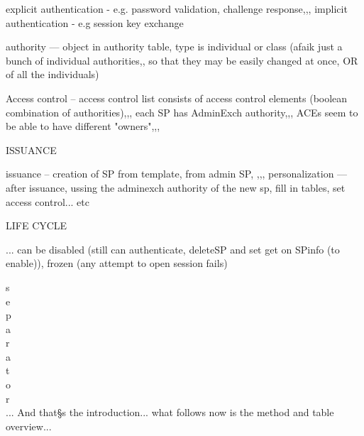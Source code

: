 \documentclass[
  digital, %
  oneside, %
  nolof,     %
  nolot,     %
]{fithesis4}
\begin{document}
explicit authentication - e.g. password validation, challenge response,,,
implicit authentication - e.g session key exchange

authority --- object in authority table, type is individual or class (afaik just a bunch of individual authorities,, so that they may be easily changed at once, OR of all the individuals)

Access control -- access control list consists of access control elements (boolean combination of authorities),,,
each SP has AdminExch authority,,, 
ACEs seem to be able to have different "owners",,,

ISSUANCE

issuance -- creation of SP from template, from admin SP, ,,,
personalization --- after issuance, ussing the adminexch authority of the new sp, fill in tables, set access control... etc

LIFE CYCLE

... can be disabled (still can authenticate, deleteSP and set get on SPinfo (to enable)), frozen (any attempt to open session fails)


s \\
e \\
p \\
a \\
r \\
a \\
t \\
o \\
r \\

... And that§s the introduction... what follows now is the method and table overview...




\printbibliography[heading=bibintoc] %
\end{document}
